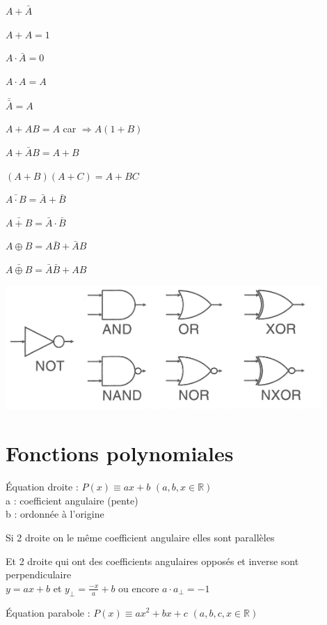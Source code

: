 \documentclass[a4paper,12pt]{article}
\newcommand\tab[1][]{\hspace*{#1}}
\begin{document}
$A + \bar{A}$

$A + A = 1$

$A \cdot \bar{A} = 0$

$A \cdot A = A$

$\bar{\bar{A}} = A$

\vspace{\baselineskip}
$A + AB = A$ \tab[1cm] car $\Rightarrow A(1+B)$

$A + \bar{A}B = A + B$

$(A + B)(A + C) = A + BC$

\vspace{\baselineskip}
$\bar{A \cdot B} = \bar{A} + \bar{B}$

$\bar{A + B} = \bar{A} \cdot \bar{B}$

$A \oplus B = A\bar{B} + \bar{A}B$

$\bar{A \oplus B} = \bar{A}\bar{B} + AB$ 

\vspace{\baselineskip}
\begin{center}
\includegraphics[width=0.9\textwidth]{SymbolesLogique.jpg}
\end{center}
\newpage
\section{Fonctions polynomiales }

Équation droite : $P(x) \equiv ax + b$ $(a,b,x \in \mathbb{R})$ \\
\tab[1cm] a : coefficient angulaire (pente) \\
\tab[1cm] b : ordonnée à l'origine

Si 2 droite on le même coefficient angulaire elles sont parallèles

Et 2 droite qui ont des coefficients angulaires opposés et inverse sont perpendiculaire\\
\tab[1cm] $y = ax + b$ et $y_\bot = \frac{-x}{a} + b$ 
\tab[.5cm] ou encore $a \cdot a_\bot = -1$

\vspace{\baselineskip}
Équation parabole : $P(x) \equiv ax^2 + bx + c$ $(a,b,c,x \in \mathbb{R})$
\end{document}
